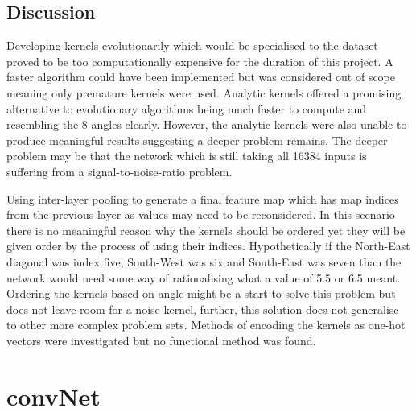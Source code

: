 \subsection{Discussion}
Developing kernels evolutionarily which would be specialised to the dataset proved to be too computationally expensive for the duration of this project. 
A faster algorithm could have been implemented but was considered out of scope meaning only premature kernels were used.
Analytic kernels offered a promising alternative to evolutionary algorithms being much faster to compute and resembling the 8 angles clearly.
However, the analytic kernels were also unable to produce meaningful results suggesting a deeper problem remains. 
The deeper problem may be that the network which is still taking all 16384 inputs is suffering from a signal-to-noise-ratio problem.

Using inter-layer pooling to generate a final feature map which has map indices from the previous layer as values may need to be reconsidered.
In this scenario there is no meaningful reason why the kernels should be ordered yet they will be given order by the process of using their indices.
Hypothetically if the North-East diagonal was index five, South-West was six and South-East was seven than the network would need some way of rationalising what a value of 5.5 or 6.5 meant. 
Ordering the kernels based on angle might be a start to solve this problem but does not leave room for a noise kernel, further, this solution does not generalise to other more complex problem sets.
Methods of encoding the kernels as one-hot vectors were investigated but no functional method was found. 


\section{convNet}

